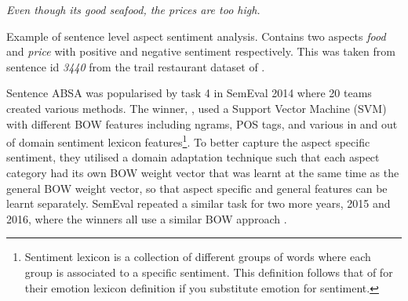 \begin{example}
\textit{Even though its good seafood, the prices are too high.}
\caption{Example of sentence level aspect sentiment analysis. Contains two aspects \textit{food} and \textit{price} with positive and negative sentiment respectively. This was taken from sentence id \textit{3440} from the trail restaurant dataset of \citet{pontiki-etal-2014-semeval}.}
\label{example:lit_review_sentence_aspect_sentiment_2}
\end{example}

Sentence ABSA was popularised by task 4 in SemEval 2014 \citep{pontiki-etal-2014-semeval} where 20 teams created various methods. The winner, \citet{kiritchenko-etal-2014-nrc}, used a Support Vector Machine (SVM) \citep{chang2011libsvm} with different BOW features including ngrams, POS tags, and various in and out of domain sentiment lexicon features\footnote{Sentiment lexicon is a collection of different groups of words where each group is associated to a specific sentiment. This definition follows that of \citet{mohammad-turney-2010-emotions} for their emotion lexicon definition if you substitute emotion for sentiment.}. To better capture the aspect specific sentiment, they utilised a domain adaptation technique \citep{daume-iii-2007-frustratingly} such that each aspect category had its own BOW weight vector that was learnt at the same time as the general BOW weight vector, so that aspect specific and general features can be learnt separately. SemEval repeated a similar task for two more years, 2015 and 2016, where the winners all use a similar BOW approach \citep{saias-2015-sentiue, brun-etal-2016-xrce, kumar-etal-2016-iit}. 

